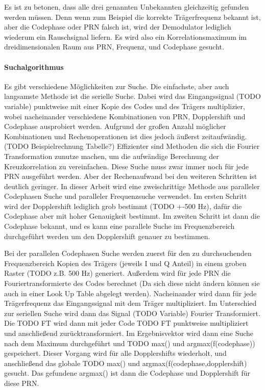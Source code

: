 Es ist zu betonen, dass alle drei genannten Unbekannten gleichzeitig gefunden werden müssen. Denn wenn zum Beispiel die korrekte Trägerfrequenz bekannt ist, aber die Codephase oder PRN falsch ist, wird der Demodulator lediglich wiederum ein Rauschsignal liefern. Es wird also ein Korrelationsmaximum im dreidimensionalen Raum aus PRN, Frequenz, und Codephase gesucht.

\paragraph{Suchalgorithmus}
Es gibt verschiedene Möglichkeiten zur Suche. Die einfachste, aber auch langsamste Methode ist die serielle Suche. Dabei wird das Eingangssignal (TODO variable) punktweise mit einer Kopie des Codes und des Trägers multiplizier, wobei nacheinander verschiedene Kombinationen von PRN, Dopplershift und Codephase ausprobiert werden. Aufgrund der großen Anzahl möglicher Kombinationen und Rechenoperationen ist dies jedoch äußerst zeitaufwändig. (TODO Beispielrechnung Tabelle?)
Effizienter sind Methoden die sich die Fourier Transformation zunutze machen, um die aufwändige Berechnung der Kreuzkorrelation zu vereinfachen. Diese Suche muss zwar immer noch für jede PRN ausgeführt werden. Aber der Rechenaufwand bei den weiteren Schritten ist deutlich geringer. 
In dieser Arbeit wird eine zweischrittige Methode aus paralleler Codephasen Suche und paralleler Frequenzsuche verwendet. Im ersten Schritt wird der Dopplershift lediglich grob bestimmt (TODO +-500 Hz), dafür die Codephase aber mit hoher Genauigkeit bestimmt. Im zweiten Schritt ist dann die Codephase bekannt, und es kann eine parallele Suche im Frequenzbereich durchgeführt werden um den Dopplershift genauer zu bestimmen.

Bei der parallelen Codephasen Suche werden zuerst für den zu durchsuchenden Frequenzbereich Kopien des Trägers (jeweils I und Q Anteil) in einem groben Raster (TODO z.B. 500 Hz) generiert. Außerdem wird für jede PRN die Fouriertransformierte des Codes berechnet (Da sich diese nicht ändern können sie auch in einer Look Up Table abgelegt werden). Nacheinander wird dann für jede Trägerfrequenz das Eingangssignal mit dem Träger multipliziert. Im Unterschied zur seriellen Suche wird dann das Signal (TODO Variable) Fourier Transformiert. Die TODO FT wird dann mit jeder Code TODO FT punktweise multipliziert und anschließend zurücktransformiert. Im Ergebnisvektor wird dann eine Suche nach dem Maximum durchgeführt und TODO max() und argmax(f(codephase)) gespeichert. Dieser Vorgang wird für alle Dopplershifts wiederholt, und anschließend das globale TODO max() und argmax(f(codephase,dopplershift) gesucht. Das gefundene argmax() ist dann die Codephase und Dopplershift für diese PRN.

